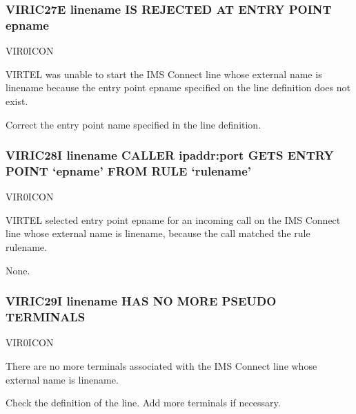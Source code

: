 \documentclass[letterpaper,10pt,english]{sphinxmanual}
\begin{document}
\subsubsection{VIRIC27E linename IS REJECTED AT ENTRY POINT epname}
\label{\detokenize{messages:viric27e-linename-is-rejected-at-entry-point-epname}}\begin{description}
\sphinxAtStartPar
VIR0ICON

\sphinxAtStartPar
VIRTEL was unable to start the IMS Connect line whose external name is linename because the entry point epname specified on the line definition does not exist.

\sphinxAtStartPar
Correct the entry point name specified in the line definition.

\end{description}


\subsubsection{VIRIC28I linename CALLER ipaddr:port GETS ENTRY POINT ‘epname’ FROM RULE ‘rulename’}
\label{\detokenize{messages:viric28i-linename-caller-ipaddr-port-gets-entry-point-epname-from-rule-rulename}}\begin{description}
\sphinxAtStartPar
VIR0ICON

\sphinxAtStartPar
VIRTEL selected entry point epname for an incoming call on the IMS Connect line whose external name is linename, because the call matched the rule rulename.

\sphinxAtStartPar
None.

\end{description}


\subsubsection{VIRIC29I linename HAS NO MORE PSEUDO TERMINALS}
\label{\detokenize{messages:viric29i-linename-has-no-more-pseudo-terminals}}\begin{description}
\sphinxAtStartPar
VIR0ICON

\sphinxAtStartPar
There are no more terminals associated with the IMS Connect line whose external name is linename.

\sphinxAtStartPar
Check the definition of the line. Add more terminals if necessary.

\end{description}
\end{document}
